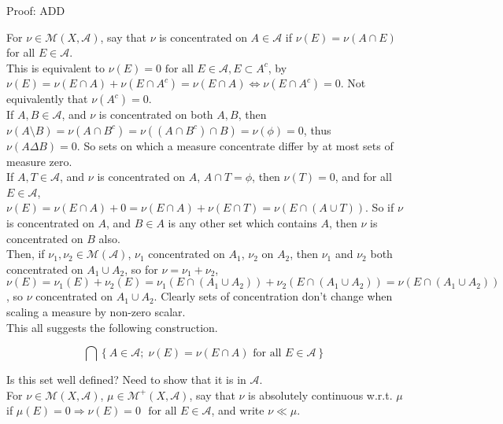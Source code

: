 \documentclass[12pt]{article}
\newcommand{\fall}[0] { \textrm{ for all } }
\newcommand{\rimply}[0] { \Rightarrow }
\newcommand{\lrimply}[0] { \Leftrightarrow }
\newcommand{\A}[0] { \mathcal{A} }
\newcommand{\M}[0] { \mathcal{M} }
\begin{document}
\noindent
Proof: ADD \\





\break

For $\nu \in \M(X, \A)$, say that $\nu$ is concentrated on $A \in \A$ if $\nu(E) = \nu(A \cap E)$ for all $E \in \A$. \\

\noindent
This is equivalent to $\nu(E) = 0 \fall E \in \A, E \subset A^c$, by $\nu(E) = \nu(E \cap A) + \nu( E \cap A^c) = \nu(E \cap A) \lrimply \nu( E \cap A^c) = 0$.  Not equivalently that $\nu(A^c) = 0$. \\


\noindent
If $A,B \in \A$, and $\nu$ is concentrated on both $A,B$, then $\nu(A \setminus B) = \nu( A \cap B^c) = \nu( (A \cap B^c) \cap B ) = \nu( \phi ) = 0$, thus $\nu( A \Delta B) = 0$. So sets on which a measure concentrate differ by at most sets of measure zero. \\


\noindent
If $A,T \in \A$, and $\nu$ is concentrated on $A$, $A \cap T = \phi$, then $\nu(T) = 0$, and for all $E \in \A$, $\nu(E) = \nu(E \cap A) + 0 = \nu(E \cap A) + \nu(E \cap T) = \nu(E \cap (A \cup T))$. So if $\nu$ is concentrated on $A$, and $B \in A$ is any other set which contains $A$, then $\nu$ is concentrated on $B$ also. \\


\noindent
Then, if $\nu_1, \nu_2 \in \M(\A)$, $\nu_1$ concentrated on $A_1$, $\nu_2$ on $A_2$, then $\nu_1$ and $\nu_2$ both concentrated on $A_1 \cup A_2$, so for $\nu = \nu_1 + \nu_2$, $\nu(E) = \nu_1(E) + \nu_2(E) = \nu_1(E \cap (A_1 \cup A_2) ) + \nu_2(E \cap (A_1 \cup A_2) ) = \nu(E \cap (A_1 \cup A_2))$, so $\nu$ concentrated on $A_1\cup A_2$. Clearly sets of concentration don't change when scaling a measure by non-zero scalar. \\



\noindent
This all suggests the following construction.

$$
    \bigcap \left\{ A \in \A ; \; \nu(E) = \nu(E \cap A) \fall E \in \A  \right\}
$$

\noindent
Is this set well defined? Need to show that it is in $\A$. \\


For $\nu \in \M(X, \A)$, $\mu \in \M^+(X, \A)$, say that $\nu$ is absolutely continuous w.r.t. $\mu$ if $\mu(E) = 0 \rimply \nu(E) = 0$ $\fall E \in \A$, and write $\nu \ll \mu$. \\
\end{document}
